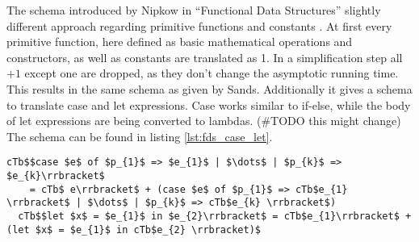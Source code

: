 The schema introduced by Nipkow in ``Functional Data Structures'' slightly different approach regarding primitive functions and constants \cite{fds}.
At first every primitive function, here defined as basic mathematical operations and constructors, as well as constants are translated as 1.
In a simplification step all $+ 1$ except one are dropped, as they don't change the asymptotic running time.
This results in the same schema as given by Sands.
Additionally it gives a schema to translate case and let expressions.
Case works similar to if-else, while the body of let expressions are being converted to lambdas. (\#TODO this might change)
The schema can be found in listing \ref{lst:fds_case_let}.
\begin{lstlisting}[language=translation,label=lst:fds_case_let,caption=Translation schema for case- and let-expression by Nipkow,mathescape=true]
  cTb$$case $e$ of $p_{1}$ => $e_{1}$ | $\dots$ | $p_{k}$ => $e_{k}\rrbracket$
    = cTb$ e\rrbracket$ + (case $e$ of $p_{1}$ => cTb$e_{1} \rrbracket$ | $\dots$ | $p_{k}$ => cTb$e_{k} \rrbracket$)
  cTb$$let $x$ = $e_{1}$ in $e_{2}\rrbracket$ = cTb$e_{1}\rrbracket$ + (let $x$ = $e_{1}$ in cTb$e_{2} \rrbracket)$
\end{lstlisting}
